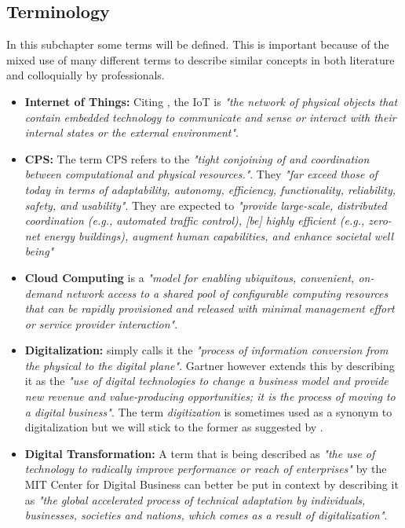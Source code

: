 \subsection{Terminology}
In this subchapter some terms will be defined. This is important because of the mixed use of many different terms to describe similar concepts in both literature and colloquially by professionals.

\begin{itemize}

\item \textbf{Internet of Things:} Citing \citeauthor{iot-def:2016}, the \ac{IoT} is \emph{"the network of physical objects that contain embedded technology to communicate and sense or interact with their internal states or the external environment"}.
  
  
  \item \textbf{\acl{CPS}:} The term \ac{CPS} refers to the \emph{"tight conjoining of and coordination between computational and physical resources."}. They \emph{"far exceed those of today in terms of adaptability, autonomy, efficiency, functionality, reliability, safety, and usability"}. They are expected to \emph{"provide large-scale, distributed coordination (e.g., automated traffic control), [be] highly efficient (e.g., zero-net energy buildings), augment human capabilities, and enhance societal well being"}  \cite{cps:nsf:2011}
  
  \item \textbf{Cloud Computing} is a \emph{"model for enabling ubiquitous, convenient, on-demand network access to a shared pool of configurable computing resources that can be rapidly provisioned and released with minimal management effort or service provider interaction"}\cite{Mell:2011:SND:2206223}.
  
  \item \textbf{Digitalization:} \citeauthor{khan-digital:2016} simply calls it the \emph{"process of information conversion from the physical to the digital plane"}. Gartner however extends this by describing it as the \emph{"use of digital technologies to change a business model and provide new revenue and value-producing opportunities; it is the process of moving to a digital business"}. The term \emph{digitization} is sometimes used as a synonym to digitalization but we will stick to the former as suggested by \citeauthor{khan-digital:2016}.
  
  \item \textbf{Digital Transformation:} A term that is being described as \emph{"the use of technology to radically improve performance or reach of enterprises"}\cite{westerman2011digital} by the MIT Center for Digital Business can better be put in context by describing it as \emph{"the global accelerated process of technical adaptation by individuals, businesses, societies and nations, which comes as a result of digitalization"}\cite{bonnect2014leading,khan-digital:2016}.
  

\end{itemize}
